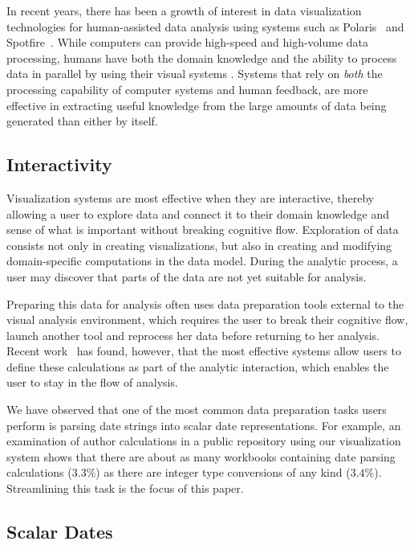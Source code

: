 In recent years, there has been a growth of interest in data visualization technologies for human-assisted data analysis using systems such as Polaris~\cite{Stolte:2008} and Spotfire~\cite{Ahlberg:1996}. While computers can provide high-speed and high-volume data processing, humans have both the domain knowledge and the ability to process data in parallel by using their visual systems \cite{Cleveland.McGill1984,Mackinlay:1986}. 
Systems that rely on \emph{both} the processing capability of computer systems and human feedback, are more effective in extracting useful knowledge from the large amounts of data being generated than either by itself.

\subsection{Interactivity}
Visualization systems are most effective when they are interactive, thereby allowing a user to explore data and connect it to their domain knowledge and sense of what is important without breaking cognitive flow. 
Exploration of data consists not only in creating visualizations, but also in creating and modifying domain-specific computations in the data model. 
During the analytic process, a user may discover that parts of the data are not yet suitable for analysis. 

Preparing this data for analysis often uses data preparation tools external to the visual analysis environment, which requires the user to break their cognitive flow, launch another tool and reprocess her data before returning to her analysis. 
Recent work~\cite{Morton:2012} has found, however, that the most effective systems allow users to define these calculations as part of the analytic interaction, which enables the user to stay in the flow of analysis.

We have observed that one of the most common data preparation tasks users perform is parsing date strings into scalar date representations.
For example, an examination of author calculations in a public repository using our
visualization system shows that there are about as many workbooks containing date parsing calculations ($3.3\%$) as there are
integer type conversions of any kind ($3.4\%$).
Streamlining this task is the focus of this paper.

\subsection{Scalar Dates}


